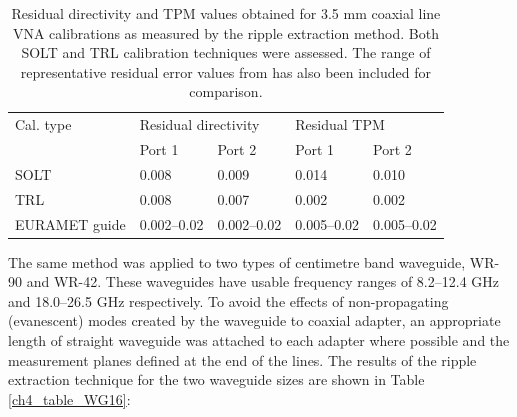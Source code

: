 \documentclass[../thesis/thesis.tex]{subfiles}
\begin{document}
\begin{refsection}
\begin{table}[]
	\begin{tabular}{lllll}
	\hline
	Cal. type       & \multicolumn{2}{l}{Residual directivity} & \multicolumn{2}{l}{Residual TPM} \\
	& Port 1              & Port 2             & Port 1          & Port 2         \\ \hline
	SOLT            & 0.008               & 0.009              & 0.014           & 0.010          \\
	TRL             & 0.008               & 0.007              & 0.002           & 0.002          \\
	EURAMET guide \cite{EURAMET_2011} & 0.002--0.02         & 0.002--0.02        & 0.005--0.02     & 0.005--0.02    \\ \hline
\end{tabular}
	\caption{Residual directivity and TPM values obtained for 3.5 mm coaxial line VNA calibrations as measured by the ripple extraction method. Both SOLT and TRL calibration techniques were assessed. The range of representative residual error values from \cite{EURAMET_2011} has also been included for comparison.}
	\label{ch4_table_coax}
\end{table}

 The same method was applied to two types of centimetre band waveguide, WR-90 and WR-42. These waveguides have usable frequency ranges of 8.2--12.4 GHz and 18.0--26.5 GHz respectively. To avoid the effects of non-propagating (evanescent) modes created by the waveguide to coaxial adapter, an appropriate length of straight waveguide was attached to each adapter where possible and the measurement planes defined at the end of the lines. The results of the ripple extraction technique for the two waveguide sizes are shown in Table \ref{ch4_table_WG16}:


\end{refsection}
\end{document}
